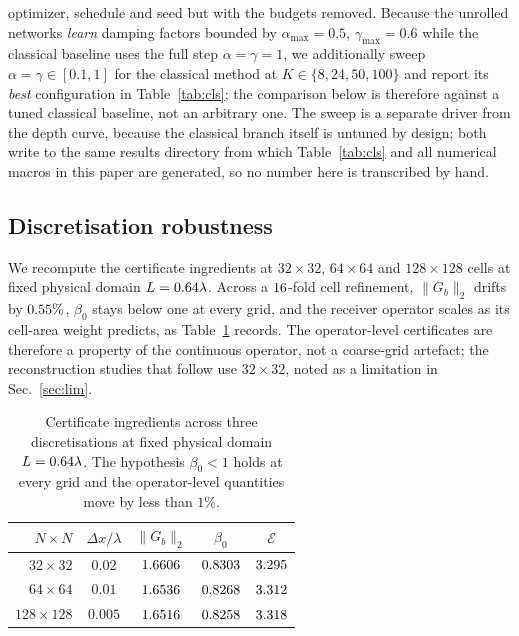 \documentclass[journal,cmes,article,submit,moreauthors,pdftex]{Definitions/tsp}
\newcommand{\norm}[1]{\lVert #1 \rVert}
\newcommand{\numv}[1]{#1}
\begin{document}
optimizer, schedule and seed but with the budgets removed. Because the unrolled networks
\emph{learn} damping factors bounded by $\alpha_{\max}=0.5$, $\gamma_{\max}=0.6$ while the
classical baseline uses the full step $\alpha=\gamma=1$, we additionally sweep
$\alpha=\gamma\in[0.1,1]$ for the classical method at $K\in\{8,24,50,100\}$ and report its
\emph{best} configuration in Table~\ref{tab:cls}; the comparison below is therefore against a
tuned classical baseline, not an arbitrary one. The sweep is a separate driver
from the depth curve, because the classical branch itself is
untuned by design; both write to the same results directory from which Table~\ref{tab:cls} and all
numerical macros in this paper are generated, so no number here is transcribed by hand.
\subsection{Discretisation robustness}
\label{sec:grid}
We recompute the certificate ingredients at $32\times32$, $64\times64$ and
$128\times128$ cells at fixed physical domain $L=\numv{\NumGridL}\lambda$. Across a
$\numv{\NumGridFactor}$-fold cell refinement, $\norm{G_b}_2$ drifts by
$\numv{\NumGridDriftGbPct}\%$, $\beta_0$ stays below one at every grid, and the receiver
operator scales as its cell-area weight predicts, as Table~\ref{tab:grid} records. The operator-level
certificates are therefore a property of the continuous operator, not a coarse-grid artefact;
the reconstruction studies that follow use $32\times32$, noted as a limitation in
Sec.~\ref{sec:lim}.

\begin{table}[htbp]
\centering
\caption{Certificate ingredients across three discretisations at fixed physical domain $L=\numv{\NumGridL}\lambda$. The hypothesis $\beta_0<1$ holds at every grid and the operator-level quantities move by less than $1\%$.}
\label{tab:grid}
\small
\begin{tabular}{rcccc}
\toprule
$N\times N$ & $\Delta x/\lambda$ & $\norm{G_b}_2$ & $\beta_0$ & $\mathcal{E}$ \\
\midrule
$32\times32$   & $0.02$  & $\numv{\NumGridGbLo}$  & $\numv{\NumGridBetaLo}$  & $\numv{\NumGridELo}$ \\
$64\times64$   & $0.01$  & $\numv{\NumGridGbMd}$  & $\numv{\NumGridBetaMd}$  & $\numv{\NumGridEMd}$ \\
$128\times128$ & $0.005$ & $\numv{\NumGridGbHi}$ & $\numv{\NumGridBetaHi}$ & $\numv{\NumGridEHi}$ \\
\bottomrule
\end{tabular}
\end{table}
\end{document}
